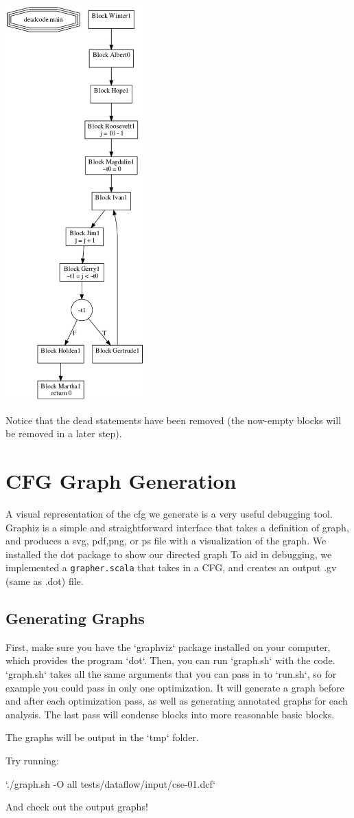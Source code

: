 \documentclass[11pt]{article}
\begin{document}
  \includegraphics[width=0.4\textwidth]{./after_deadcode_example.png}

  Notice that the dead statements have been removed (the now-empty blocks will be removed in a later step).
\section{CFG Graph Generation}
\label{sec-4}

    A visual representation of the cfg we generate is a very useful debugging tool. 
    Graphiz is a simple and straightforward interface that takes a definition of graph, and
    produces a svg, pdf,png, or ps file with a visualization of the graph.
    We installed the dot package to show our directed graph
    To aid in debugging, we implemented a \verb~grapher.scala~ that takes in a CFG,
    and creates an output .gv (same as .dot) file.
\subsection{Generating Graphs}
\label{sec-4-1}

   First, make sure you have the `graphviz` package installed on your computer, which provides the program
   `dot`. Then, you can run `graph.sh` with the code. `graph.sh` takes all the same arguments that you can
   pass in to `run.sh`, so for example you could pass in only one optimization. It will generate a graph
   before and after each optimization pass, as well as generating annotated graphs for each analysis. 
   The last pass will condense blocks into more reasonable basic blocks.

   The graphs will be output in the `tmp` folder. 

   Try running:

   `./graph.sh -O all tests/dataflow/input/cse-01.dcf`

   And check out the output graphs!
\end{document}
